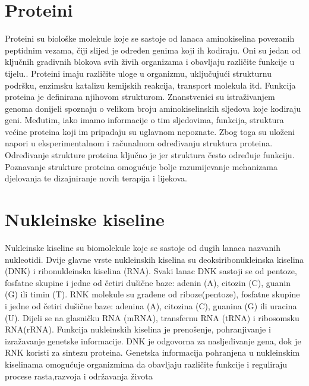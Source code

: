 \documentclass[times, utf8, zavrsni]{fer}
\begin{document}
\section{Proteini}
 Proteini su biološke molekule koje se sastoje od lanaca aminokiselina povezanih peptidnim vezama, čiji slijed je određen genima koji ih kodiraju. Oni su jedan od ključnih gradivnih blokova svih živih organizama i obavljaju različite funkcije u tijelu.. Proteini imaju različite uloge u organizmu, uključujući strukturnu podršku, enzimsku katalizu kemijskih reakcija, transport molekula itd.  Funkcija proteina je definirana njihovom strukturom. Znanstvenici su istraživanjem genoma donijeli spoznaju o velikom broju aminokiselinskih sljedova koje kodiraju geni. Međutim, iako imamo informacije o tim sljedovima, funkcija, struktura većine proteina koji im pripadaju su uglavnom nepoznate. Zbog toga su uloženi napori u eksperimentalnom i računalnom određivanju struktura proteina. Određivanje strukture proteina ključno je jer struktura često 
određuje funkciju. Poznavanje strukture proteina omogućuje bolje razumijevanje mehanizama djelovanja te dizajniranje novih terapija i lijekova. \cite{janjic}

\section{Nukleinske kiseline}
 Nukleinske kiseline su biomolekule koje se sastoje od dugih lanaca nazvanih nukleotidi. Dvije glavne vrste nukleinskih kiselina su deoksiribonukleinska kiselina (DNK)
 i ribonukleinska kiselina (RNA). Svaki lanac DNK sastoji se od pentoze, fosfatne skupine i jedne od četiri dušične baze: adenin (A), citozin (C), guanin (G) ili timin (T). RNK molekule su građene od riboze(pentoze), fosfatne skupine i jedne od četiri dušične baze: adenina (A), citozina (C), guanina (G) ili uracina (U). Dijeli se na glasničku RNA (mRNA), transfernu RNA (tRNA) i ribosomsku RNA(rRNA).
Funkcija nukleinskih kiselina je prenošenje, pohranjivanje i izražavanje genetske informacije. DNK je odgovorna za nasljeđivanje gena, dok je RNK koristi za sintezu proteina. Genetska informacija pohranjena u nukleinskim kiselinama omogućuje organizmima da obavljaju različite funkcije i reguliraju procese rasta,razvoja i održavanja života
\end{document}
